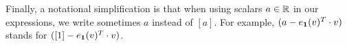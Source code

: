 %
%
%
%
%
Finally, a notational simplification is that when using scalars $a\in\mathbb{R}$ in our expressions, we write sometimes
$a$ instead of $[a]$. For example,  $(a-e_{\mathbf{1}}(v)^T\cdot v)$ stands for  $([1]-e_{\mathbf{1}}(v)^T\cdot v)$.

%
